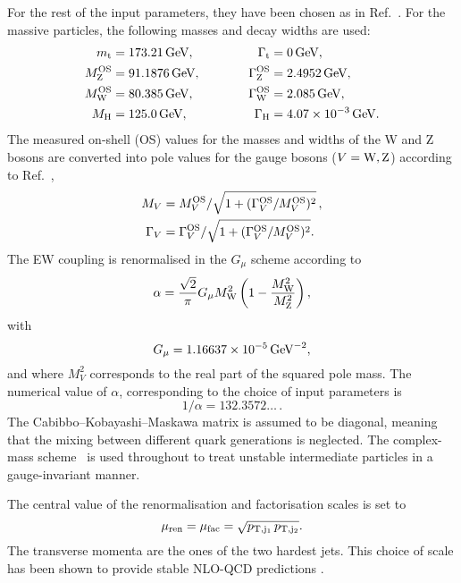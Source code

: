 \documentclass[11pt,epsf]{article}
\begin{document}
    For the rest of the input parameters, they have been chosen as in Ref.~\cite{Ballestrero:2018anz}.
    For the massive particles, the following masses and decay widths are used:
    \begin{alignat}{2}
                      m_\text{t}   &=  173.21\,\text{GeV},       & \quad \quad \quad \Gamma_\text{t} &= 0 \,\text{GeV},  \nonumber \\
                    M_\text{Z}^\text{OS} &=  91.1876\,\text{GeV},      & \quad \quad \quad \Gamma_\text{Z}^\text{OS} &= 2.4952\,\text{GeV},  \nonumber \\
                    M_\text{W}^\text{OS} &=  80.385\,\text{GeV},       & \Gamma_\text{W}^\text{OS} &= 2.085\,\text{GeV},  \nonumber \\
                    M_{\rm H} &=  125.0\,\text{GeV},       &  \Gamma_\text{H}   &=  4.07 \times 10^{-3}\,\text{GeV}.
    \end{alignat}
    The measured on-shell (OS) values for the masses and widths of the W and Z bosons are converted into pole values for the gauge bosons ($V=\text{W},\text{Z}$) according to Ref.~\cite{Bardin:1988xt},
    \begin{equation}
    \begin{split}
            M_V &= M_{V}^\text{OS}/\sqrt{1+(\Gamma_{V}^\text{OS}/M_{V}^\text{OS})^2}\,, \\
       \Gamma_V &= \Gamma_{V}^\text{OS}/\sqrt{1+(\Gamma_{V}^\text{OS}/M_{V}^\text{OS})^2}.
    \end{split}
    \end{equation}
    The EW coupling is renormalised in the $G_\mu$ scheme \cite{Denner:2000bj} according to 
    \begin{equation}
    \alpha =  \frac{\sqrt{2}}{\pi} G_{\mu} M_{\rm W}^2 \left(1-\frac{M_{\rm W}^2}{M_{\rm Z}^2} \right),
    \end{equation}
    with
    \begin{equation}
        G_{\mu}    = 1.16637\times 10^{-5}\,\text{GeV}^{-2},
    \end{equation}
    and where $M_V^2$ corresponds to the real part of the squared pole mass.
    The numerical value of $\alpha$, corresponding to the choice of input parameters is
    \begin{equation}
     1/\alpha = 132.3572\ldots\,.
    \end{equation}
    The Cabibbo--Kobayashi--Maskawa matrix is assumed to be diagonal, meaning that the mixing between different quark generations is neglected.
    The complex-mass scheme~\cite{Denner:1999gp,Denner:2005fg,Denner:2006ic} is used throughout to treat unstable intermediate particles in a gauge-invariant manner.

    The central value of the renormalisation and factorisation scales is set to 
    \begin{equation}
    \label{eq:defscale}
     \mu_{\rm ren} = \mu_{\rm fac} = \sqrt{p_{\rm T, j_1}\, p_{\rm T, j_2}} .
    \end{equation}
    The transverse momenta are the ones of the two hardest jets.
    This choice of scale has been shown to provide stable NLO-QCD predictions \cite{Denner:2012dz}.
\end{document}

